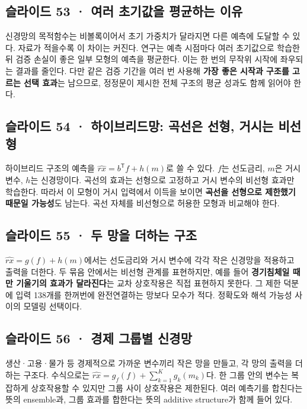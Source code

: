 \documentclass[11pt,a4paper]{article}
\begin{document}
\subsection{슬라이드 53 · 여러 초기값을 평균하는 이유}
신경망의 목적함수는 비볼록이어서 초기 가중치가 달라지면 다른 예측에 도달할 수 있다. 자료가 적을수록 이 차이는 커진다. 연구는 예측 시점마다 여러 초기값으로 학습한 뒤 검증 손실이 좋은 일부 모형의 예측을 평균한다. 이는 한 번의 무작위 시작에 좌우되는 결과를 줄인다. 다만 같은 검증 기간을 여러 번 사용해 \textbf{가장 좋은 시작과 구조를 고르는 선택 효과}는 남으므로, 정정문이 제시한 전체 구조의 평균 성과도 함께 읽어야 한다.\par

\subsection{슬라이드 54 · 하이브리드망: 곡선은 선형, 거시는 비선형}
하이브리드 구조의 예측을 $\hat{rx}=b^{\mathsf T}f+h(m)$로 쓸 수 있다. $f$는 선도금리, $m$은 거시 변수, $h$는 신경망이다. 곡선의 효과는 선형으로 고정하고 거시 변수의 비선형 효과만 학습한다. 따라서 이 모형이 거시 입력에서 이득을 보이면 \textbf{곡선을 선형으로 제한했기 때문일 가능성}도 남는다. 곡선 자체를 비선형으로 허용한 모형과 비교해야 한다.\par

\subsection{슬라이드 55 · 두 망을 더하는 구조}
$\hat{rx}=g(f)+h(m)$에서는 선도금리와 거시 변수에 각각 작은 신경망을 적용하고 출력을 더한다. 두 묶음 안에서는 비선형 관계를 표현하지만, 예를 들어 \textbf{경기침체일 때만 기울기의 효과가 달라진다}는 교차 상호작용은 직접 표현하지 못한다. 그 제한 덕분에 입력 138개를 한꺼번에 완전연결하는 망보다 모수가 적다. 정확도와 해석 가능성 사이의 모델링 선택이다.\par

\subsection{슬라이드 56 · 경제 그룹별 신경망}
생산·고용·물가 등 경제적으로 가까운 변수끼리 작은 망을 만들고, 각 망의 출력을 더하는 구조다. 수식으로는 $\hat{rx}=g_f(f)+\sum_{k=1}^{K}g_k(m_k)$다. 한 그룹 안의 변수는 복잡하게 상호작용할 수 있지만 그룹 사이 상호작용은 제한된다. 여러 예측기를 합친다는 뜻의 ensemble과, 그룹 효과를 합한다는 뜻의 additive structure가 함께 들어 있다.\par
\end{document}
